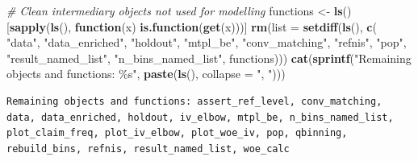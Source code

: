 \documentclass[
  english,
  11pt,
]{article}
\newenvironment{Shaded}{\begin{snugshade}}{\end{snugshade}}
\newcommand{\AttributeTok}[1]{\textcolor[rgb]{0.13,0.29,0.53}{#1}}
\newcommand{\CommentTok}[1]{\textcolor[rgb]{0.56,0.35,0.01}{\textit{#1}}}
\newcommand{\ControlFlowTok}[1]{\textcolor[rgb]{0.13,0.29,0.53}{\textbf{#1}}}
\newcommand{\FunctionTok}[1]{\textcolor[rgb]{0.13,0.29,0.53}{\textbf{#1}}}
\newcommand{\NormalTok}[1]{#1}
\newcommand{\OtherTok}[1]{\textcolor[rgb]{0.56,0.35,0.01}{#1}}
\newcommand{\StringTok}[1]{\textcolor[rgb]{0.31,0.60,0.02}{#1}}
\begin{document}
\begin{Shaded}
\begin{Highlighting}[]
\CommentTok{\# Clean intermediary objects not used for modelling}
\NormalTok{functions }\OtherTok{\textless{}{-}} \FunctionTok{ls}\NormalTok{()[}\FunctionTok{sapply}\NormalTok{(}\FunctionTok{ls}\NormalTok{(), }\ControlFlowTok{function}\NormalTok{(x) }\FunctionTok{is.function}\NormalTok{(}\FunctionTok{get}\NormalTok{(x)))]}
\FunctionTok{rm}\NormalTok{(}\AttributeTok{list =} \FunctionTok{setdiff}\NormalTok{(}\FunctionTok{ls}\NormalTok{(), }\FunctionTok{c}\NormalTok{(}
    \StringTok{"data"}\NormalTok{, }\StringTok{"data\_enriched"}\NormalTok{, }\StringTok{"holdout"}\NormalTok{, }\StringTok{"mtpl\_be"}\NormalTok{,}
    \StringTok{"conv\_matching"}\NormalTok{, }\StringTok{"refnis"}\NormalTok{, }\StringTok{"pop"}\NormalTok{, }
    \StringTok{"result\_named\_list"}\NormalTok{, }\StringTok{"n\_bins\_named\_list"}\NormalTok{,}
\NormalTok{    functions)))}
\FunctionTok{cat}\NormalTok{(}\FunctionTok{sprintf}\NormalTok{(}\StringTok{"Remaining objects and functions: \%s"}\NormalTok{, }\FunctionTok{paste}\NormalTok{(}\FunctionTok{ls}\NormalTok{(), }\AttributeTok{collapse =} \StringTok{", "}\NormalTok{)))}
\end{Highlighting}
\end{Shaded}

\begin{verbatim}
Remaining objects and functions: assert_ref_level, conv_matching, data, data_enriched, holdout, iv_elbow, mtpl_be, n_bins_named_list, plot_claim_freq, plot_iv_elbow, plot_woe_iv, pop, qbinning, rebuild_bins, refnis, result_named_list, woe_calc
\end{verbatim}
\end{document}
